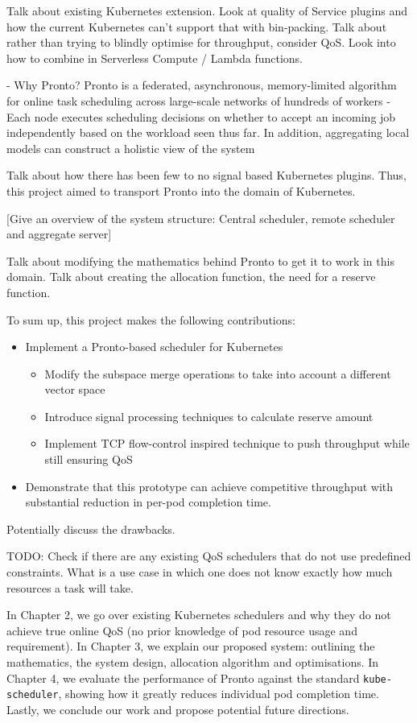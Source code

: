 Talk about existing Kubernetes extension. Look at quality of Service plugins and
how the current Kubernetes can't support that with bin-packing. Talk about
rather than trying to blindly optimise for throughput, consider QoS. Look into
how to combine in Serverless Compute / Lambda functions.

- Why Pronto? Pronto is a federated, asynchronous, memory-limited algorithm for
online task scheduling across large-scale networks of hundreds of workers
- Each node executes scheduling decisions on whether to accept an incoming job
independently based on the workload seen thus far. In addition, aggregating
local models can construct a holistic view of the system

Talk about how there has been few to no signal based Kubernetes plugins. Thus,
this project aimed to transport Pronto into the domain of Kubernetes.

[Give an overview of the system structure: Central scheduler, remote scheduler
and aggregate server]

Talk about modifying the mathematics behind Pronto to get it to work in this
domain. Talk about creating the allocation function, the need for a reserve
function.

To sum up, this project makes the following contributions:
\begin{itemize}
\item Implement a Pronto-based scheduler for Kubernetes\\
    \begin{itemize}
    \item Modify the subspace merge operations to take into account a different
    vector space
    \item Introduce signal processing techniques to calculate reserve amount
    \item Implement TCP flow-control inspired technique to push throughput while
    still ensuring QoS
    \end{itemize}
\item Demonstrate that this prototype can achieve competitive throughput with
substantial reduction in per-pod completion time.
\end{itemize}

Potentially discuss the drawbacks.

TODO: Check if there are any existing QoS schedulers that do not use predefined
constraints. What is a use case in which one does not know exactly how much
resources a task will take.

In Chapter 2, we go over existing Kubernetes schedulers and why they do not
achieve true online QoS (no prior knowledge of pod resource usage and
requirement). In Chapter 3, we explain our proposed system: outlining the
mathematics, the system design, allocation algorithm and optimisations. In
Chapter 4, we evaluate the performance of Pronto against the standard
\verb|kube-scheduler|, showing how it greatly reduces individual pod completion
time. Lastly, we conclude our work and propose potential future directions.

